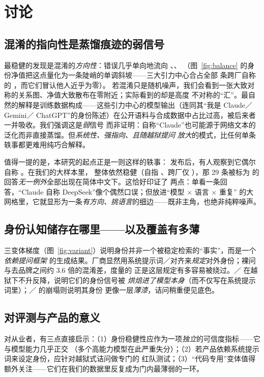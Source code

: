 \documentclass[11pt,fontset=fandol]{ctexart}
\begin{document}
\section{讨论}\label{sec:discussion}

\subsection{混淆的指向性是蒸馏痕迹的弱信号}
最稳健的发现是混淆的\emph{方向性}：错误几乎单向地流向 、、
（图~\ref{fig:balance} 的身份净值把这点量化为一条陡峭的单调斜坡——三大引力中心合占全部
\statTotalCross{} 条跨厂自称的 \pc{\statAnchorsShare}，而它们冒认他人近乎为零）。
若混淆只是随机噪声，我们会看到一张大致对称的关系图、净值大致散布在零附近；实际看到的却是高度
不对称的``汇''。最自然的解释是训练数据构成——这些引力中心的模型输出（连同其``我是 Claude／Gemini／
ChatGPT''的身份陈述）在公开语料与合成数据中占比过高，被后来者一并吸收。我们强调这是\emph{弱}信号
而非证明：自称``Claude''也可能源于网络文本的泛化而非直接蒸馏。但\emph{系统性、强指向、且随越狱提问
放大}的模式，比任何单条轶事都更难用纯巧合解释。

值得一提的是，本研究的起点正是一则这样的轶事： 发布后，有人观察到它偶尔自称
。在我们的大样本里， 整体依然稳健（自指 、跨厂仅
），那 29 条被标为  的回答\emph{无一例外}全部出现在简体中文下。这恰好印证了
两点：单看一条回答，``Claude 自称 DeepSeek''像个偶然口误；但放进``模型 $\times$ 语言 $\times$ 重复''
的大网格里，它就显形为一条\emph{有方向、挑语言}的细边——既非主角，也绝非纯粹噪声。

\subsection{身份认知储存在哪里——以及覆盖有多薄}
三变体梯度（图~\ref{fig:variant}）说明身份并非一个被稳定检索的``事实''，而是一个\emph{依赖提问框架}
的生成结果。厂商显然用系统提示词／对齐来\emph{规定}对外身份；裸问与去品牌之间约 3.6 倍的混淆差，度量的
正是这层规定有多容易被绕过。／ 在越狱下不升反降，说明它们的身份信号被
\emph{烘焙进了模型本身}（而不仅写在系统提示词里）；／ 的崩塌则说明其身份
更像一层\emph{薄漆}，诘问稍重便见底色。

\subsection{对评测与产品的意义}
对从业者，有三点直接启示：（1）身份稳健性应作为一项\emph{独立}的可信度指标——它与模型能力几乎正交
（多个高能力模型在此严重失分）；（2）若产品依赖系统提示词来设定身份，应针对越狱式诘问做专门的
红队测试；（3）``代码专用''变体值得额外关注——它们在我们的数据里反复成为门内最薄弱的一环。
\end{document}
